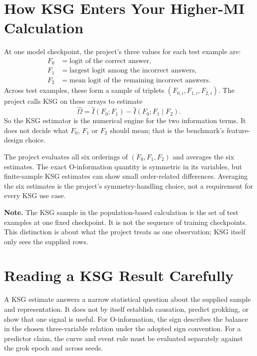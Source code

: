 \documentclass[11pt,letterpaper,oneside]{report}
\newcommand{\Note}[1]{\par\noindent\colorbox{notegray}{\parbox{0.965\linewidth}{\textbf{Note.} #1}}\par}
\begin{document}
\section{How KSG Enters Your Higher-MI Calculation}

At one model checkpoint, the project's three values for each test example are:
\begin{align}
  F_0 &= \text{logit of the correct answer},\\
  F_1 &= \text{largest logit among the incorrect answers},\\
  F_2 &= \text{mean logit of the remaining incorrect answers}.
\end{align}
Across test examples, these form a sample of triplets $(F_{0,i},F_{1,i},F_{2,i})$. The project calls KSG on these arrays to estimate
\begin{equation}
  \widehat\Omega
  =\widehat I(F_0;F_1)-\widehat I(F_0;F_1\mid F_2).
\end{equation}
So the KSG estimator is the numerical engine for the two information terms. It does not decide what $F_0$, $F_1$ or $F_2$ should mean; that is the benchmark's feature-design choice.

The project evaluates all six orderings of $(F_0,F_1,F_2)$ and averages the six estimates. The exact O-information quantity is symmetric in its variables, but finite-sample KSG estimates can show small order-related differences. Averaging the six estimates is the project's symmetry-handling choice, not a requirement for every KSG use case.

\Note{The KSG sample in the population-based calculation is the set of test examples at one fixed checkpoint. It is not the sequence of training checkpoints. This distinction is about what the project treats as one observation; KSG itself only sees the supplied rows.}

\section{Reading a KSG Result Carefully}

A KSG estimate answers a narrow statistical question about the supplied sample and representation. It does not by itself establish causation, predict grokking, or show that one signal is useful. For O-information, the sign describes the balance in the chosen three-variable relation under the adopted sign convention. For a predictor claim, the curve and event rule must be evaluated separately against the grok epoch and across seeds.
\end{document}

